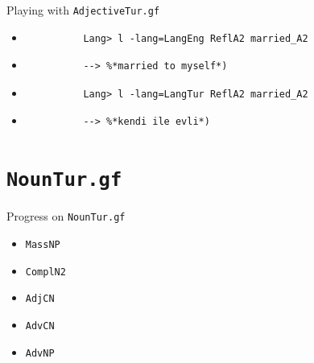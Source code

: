 \documentclass{beamer}
\begin{document}
  \begin{frame}[fragile]{Playing with \texttt{AdjectiveTur.gf}}
    \begin{itemize}
      \item<1->
        \begin{lstlisting}
          Lang> l -lang=LangEng ReflA2 married_A2
        \end{lstlisting}
      \item<2->
        \begin{lstlisting}
          --> %*married to myself*)
        \end{lstlisting}
      \item<3->
        \begin{lstlisting}
          Lang> l -lang=LangTur ReflA2 married_A2
        \end{lstlisting}
      \item<4->
        \begin{lstlisting}
          --> %*kendi ile evli*)
        \end{lstlisting}
    \end{itemize}
  \end{frame}

  \section{\texttt{NounTur.gf}}

  \begin{frame}{Progress on \texttt{NounTur.gf}}
    \begin{itemize}
      \item \texttt{MassNP}
      \item \texttt{ComplN2}
      \item \texttt{AdjCN}
      \item \texttt{AdvCN}
      \item \texttt{AdvNP}
    \end{itemize}
  \end{frame}
\end{document}
